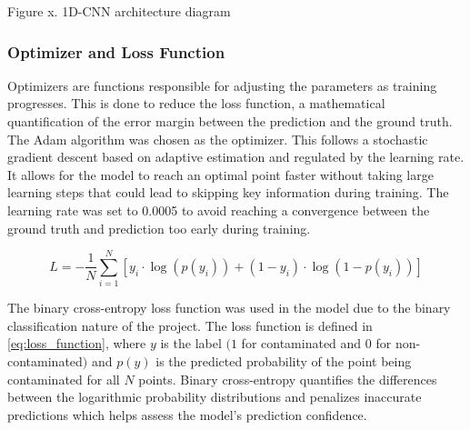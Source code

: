 \documentclass[12pt]{report}
\renewcommand{\cite}{\supercite}
\begin{document}
Figure x. 1D-CNN architecture diagram
\subsubsection{Optimizer and Loss Function}
Optimizers are functions responsible for adjusting the parameters as training progresses.\cite{eitcaacademy_2023_what} This is done to reduce the loss function, a mathematical quantification of the error margin between the prediction and the ground truth. The Adam algorithm was chosen as the optimizer. This follows a stochastic gradient descent based on adaptive estimation and regulated by the learning rate.\cite{kerasteam_keras} It allows for the model to reach an optimal point faster without taking large learning steps that could lead to skipping key information during training. The learning rate was set to 0.0005 to avoid reaching a convergence between the ground truth and prediction too early during training.

\begin{equation}
    L = -\frac{1}{N} \sum_{i=1}^{N} \left[ y_i \cdot \log(p(y_i)) + (1 - y_i) \cdot \log(1 - p(y_i)) \right]
    \label{eq:loss_function}
\end{equation}

The binary cross-entropy loss function was used in the model due to the binary classification nature of the project. The loss function is defined in \autoref{eq:loss_function}, where $y$ is the label $(1$ for contaminated and $0$ for non-contaminated$)$ and $p(y)$ is the predicted probability of the point being contaminated for all $N$ points. Binary cross-entropy quantifies the differences between the logarithmic probability distributions and penalizes inaccurate predictions which helps assess the model’s prediction confidence.

\newpage
\printbibliography %
\thispagestyle{empty}

\appendix
\end{document}
